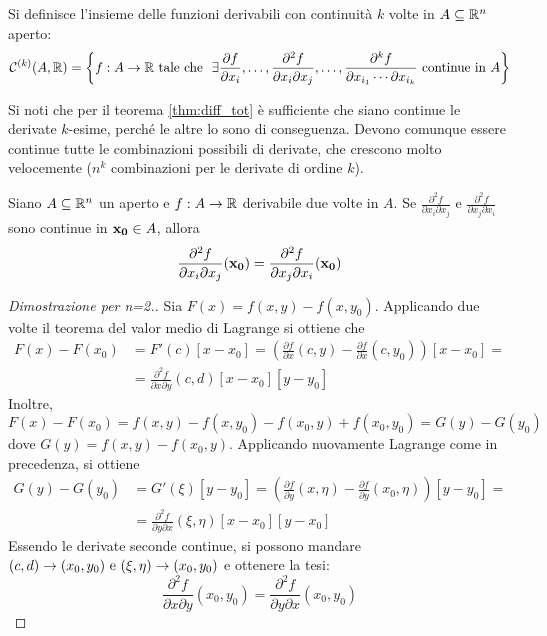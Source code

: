 \begin{definition}
    [Insieme $\C{k}(A, \R)$]
    Si definisce l'insieme delle funzioni derivabili con continuità $k$ volte in $A\subseteq\mathbb{R}^n$ aperto:
    $$
        \displaystyle \mathcal{C}^{(k)}(A,\mathbb{R}) = \left\{ f: A \to \mathbb{R} \text{ tale che } \ \exists \frac{\partial f}{\partial x_i},\dots,\frac{\partial ^2 f}{\partial x_i \partial x_j}, \dots, \frac{\partial ^k f}{\partial x_{i_1}\cdots\partial x_{i_k}} \text{ continue in } A \right\}
    $$
\end{definition}

\begin{remark}
    Si noti che per il teorema \ref{thm:diff_tot} è sufficiente che siano continue le derivate $k$-esime, perché le altre lo sono di conseguenza. Devono comunque essere continue tutte le combinazioni possibili di derivate, che crescono molto velocemente ($n^k$ combinazioni per le derivate di ordine $k$).
\end{remark}

\begin{theorem}
    [di Schwarz]\label{thm:schwarz}
    Siano $A \subseteq \mathbb{R}^n$ un aperto e $f: A \to \mathbb{R}$ derivabile due volte in $A$. Se $\frac{\partial ^2 f}{\partial x_i \partial x_j}$ e $\frac{\partial^2 f}{\partial x_j \partial x_i}$ sono continue in $\vb{x_0} \in A$, allora
    $$
        \frac{\partial ^2 f}{\partial x_i \partial x_j}(\vb{x_0}) = \frac{\partial^2  f}{\partial x_j \partial x_i}(\vb{x_0})
    $$
\end{theorem}

\begin{proof}
    [Dimostrazione per n=2.]
    Sia $F(x)=f(x,y)-f(x,y_0)$. Applicando due volte il teorema del valor medio di Lagrange si ottiene che
    \begin{align*}
        F(x)-F(x_0)&=F'(c)[x-x_0]=\left(\frac{\partial f}{\partial x}(c,y)-\frac{\partial f}{\partial x}(c,y_0) \right)[x-x_0]=\\
        &=\frac{\partial^2 f}{\partial x \partial y}(c,d)[x-x_0][y-y_0]
    \end{align*}
    Inoltre,
    $$
        F(x)-F(x_0)=f(x,y)-f(x,y_0)-f(x_0,y)+f(x_0,y_0)=G(y)-G(y_0)
    $$
    dove $G(y)=f(x,y)-f(x_0,y)$. Applicando nuovamente Lagrange come in precedenza, si ottiene
    \begin{align*}
        G(y)-G(y_0)&=G'(\xi)[y-y_0]=\left(\frac{\partial f}{\partial y}(x,\eta)-\frac{\partial f}{\partial y}(x_0,\eta)\right)[y-y_0]=\\
        &=\frac{\partial ^2f}{\partial y\partial x}(\xi,\eta)[x-x_0][y-x_0]
    \end{align*}
    Essendo le derivate seconde continue, si possono mandare $(c,d)\to(x_0,y_0) \text{ e } (\xi,\eta)\to(x_0,y_0)$ e ottenere la tesi:
    $$
        \frac{\partial^2 f}{\partial x \partial y}(x_0,y_0)=\frac{\partial^2 f}{\partial y \partial x}(x_0,y_0)
    $$
\end{proof}

